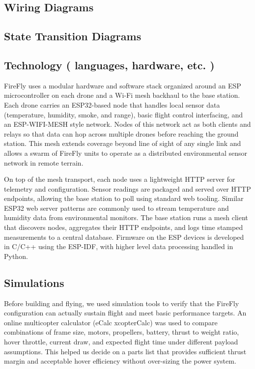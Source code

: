 \documentclass[journal, onecolumn]{IEEEtran}
\begin{document}
\subsection{Wiring Diagrams}

\vspace{0.5in}


\subsection{State Transition Diagrams}

\vspace{0.5in}


\subsection{Technology ( languages, hardware, etc. )}
FireFly uses a modular hardware and software stack organized around an ESP microcontroller on each drone and a Wi-Fi mesh backhaul to the base station. Each drone carries an ESP32-based node that handles local sensor data (temperature, humidity, smoke, and range), basic flight control interfacing, and an ESP-WIFI-MESH style network. Nodes of this network act as both clients and relays so that data can hop across multiple drones before reaching the ground station. This mesh extends coverage beyond line of sight of any single link and allows a swarm of FireFly units to operate as a distributed environmental sensor network in remote terrain.

On top of the mesh transport, each node uses a lightweight HTTP server for telemetry and configuration. Sensor readings are packaged and served over HTTP endpoints, allowing the base station to poll using standard web tooling. Similar ESP32 web server patterns are commonly used to stream temperature and humidity data from environmental monitors. The base station runs a mesh client that discovers nodes, aggregates their HTTP endpoints, and logs time stamped measurements to a central database. Firmware on the ESP devices is developed in C/C++ using the ESP-IDF, with higher level data processing handled in Python.


\vspace{0.5in}



\subsection{Simulations}
Before building and flying, we used simulation tools to verify that the FireFly configuration can actually sustain flight and meet basic performance targets. An online multicopter calculator (eCalc xcopterCalc) was used to compare combinations of frame size, motors, propellers, battery, thrust to weight ratio, hover throttle, current draw, and expected flight time under different payload assumptions. This helped us decide on a parts list that provides sufficient thrust margin and acceptable hover efficiency without over-sizing the power system. 
\end{document}

